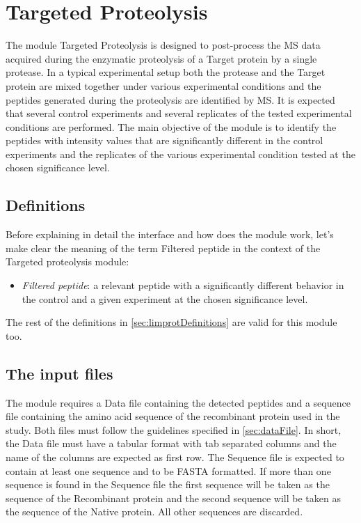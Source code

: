 \chapter{Targeted Proteolysis}
\label{chap:tarprot}

The module Targeted Proteolysis is designed to post-process the MS
data acquired during the enzymatic proteolysis of a Target protein by a single
protease. In a typical experimental setup both the protease and the Target protein
are mixed together under various experimental conditions and the peptides generated
during the proteolysis are identified by MS. It is expected that
several control experiments and several replicates of the tested experimental
conditions are performed. The main objective of the module is to identify the peptides
with intensity values that are significantly different in the control experiments
and the replicates of the various experimental condition tested at the chosen
significance level.

\section{Definitions}

Before explaining in detail the interface and how does the module work, let's make
clear the meaning of the term Filtered peptide in the context of the Targeted 
proteolysis module:

\begin{itemize}
    \item \textit{Filtered peptide}: a relevant peptide with a significantly different
    behavior in the control and a given experiment at the chosen significance level.
    \label{par:tarprotPIP}
\end{itemize}

The rest of the definitions in \autoref{sec:limprotDefinitions} are valid for this
module too.

\section{The input files}

The module requires a Data file containing the detected peptides
and a sequence file containing the amino acid sequence of the recombinant protein
used in the study. Both files must follow the guidelines specified in \autoref{sec:dataFile}.
In short, the Data file must have a tabular format with tab separated columns and
the name of the columns are expected as first row. The Sequence file is expected
to contain at least one sequence and to be FASTA formatted. If more than one sequence
is found in the Sequence file the first sequence will be taken as the sequence of
the Recombinant protein and the second sequence will be taken as the sequence of
the Native protein. All other sequences are discarded.

